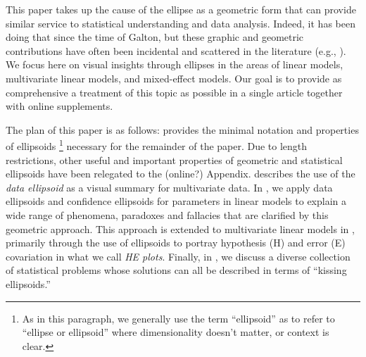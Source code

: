 This paper  takes up  the cause  of the  ellipse as  a geometric  form that  can
provide similar service to statistical understanding and data analysis.  Indeed,
it has been doing that since the time of Galton, but these graphic and geometric
contributions have often  been incidental and  scattered in the  literature
(e.g., \citealp{Bryant:1984,CampbellAtchley:81,SavilleWood:1991,Wickens:1995}). 
We focus here on visual  insights through ellipses in  the areas of linear  models,
multivariate linear models, and mixed-effect models.  Our goal is to provide as
comprehensive a treatment of this topic as possible in a single article
together with online supplements.

The plan of this paper is as follows:  provides the minimal notation and
properties of ellipsoids%
\footnote{As in this paragraph,    
we generally use the term ``ellipsoid'' as to refer to ``ellipse or ellipsoid'' where dimensionality doesn't matter, or context is clear.}
 necessary for the remainder of the paper.  Due to length restrictions,
other useful and important properties of geometric and statistical ellipsoids have been relegated
to the (online?) Appendix.  describes the use of the \emph{data ellipsoid}
as a visual summary for multivariate data. In , we apply data ellipsoids and
confidence ellipsoids for parameters in linear models to explain a wide range of phenomena, paradoxes and fallacies
that are clarified by this geometric approach.    
This approach is extended to multivariate linear models in , primarily through the use
of ellipsoids to portray hypothesis (H) and error (E) covariation in what we call \emph{HE plots}.
Finally, in , we discuss a diverse collection of statistical problems whose solutions
can all be described in terms of ``kissing ellipsoids.''
                                                                                                                    